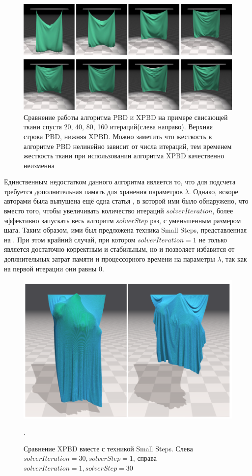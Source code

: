 	\begin{figure}[ht!] 
		\center
		\includegraphics [scale=0.4] {my_folder/images//pbd_vs_xpbd}
		\caption{Сравнение работы алгоритма PBD и XPBD на примере свисающей ткани спустя 20, 40, 80, 160 итераций(слева направо). Верхняя строка PBD, нижняя XPBD. Можно заметить что жесткость в алгоритме PBD нелинейно зависит от числа итераций, тем временем жесткость ткани при использовании алгоритма XPBD качественно неизменна }
		\label{fig:pbd-vs-xpbd}  
	\end{figure}
	
	Единственным недостатком данного алгоритма является то, что для подсчета требуется дополнительная память для хранения параметров $\lambda$. Однако, вскоре авторами была выпущена ещё одна статья \cite{macklin2019small}, в которой ими было обнаружено, что вместо того, чтобы увеличивать количество итераций $solverIteration$, более эффективно запускать весь алгоритм $solverStep$ раз, с уменьшенным размером шага. Таким образом, ими был предложена техника Small Steps, представленная на . При этом крайний случай, при котором $solverIteration = 1$ не только является достаточно корректным и стабильным, но и позволяет избавится от доплнительных затрат памяти и процессорного времени на параметры $\lambda$, так как на первой итерации они равны 0.
	
		
	\begin{figure}[ht!] 
		\center
		\includegraphics [scale=0.3] {my_folder/images//smallsteps}
		\caption{Сравнение XPBD вместе с техникой Small Steps. Слева $solverIteration = 30, solverStep = 1$, справа $solverIteration = 1, solverStep = 30$}.
		\label{fig:smallstep}  
	\end{figure}
	
